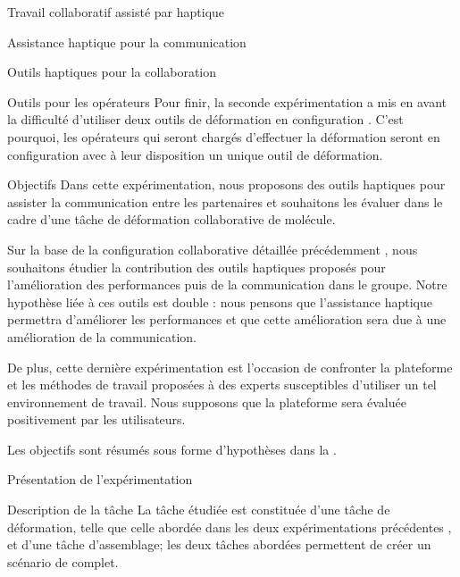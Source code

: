 \documentclass[myfrancais,ngerman,english,french]{mythesis}
\begin{document}
\begin{mychapter}{Travail collaboratif assisté par haptique}
\begin{mysection}{Assistance haptique pour la communication}
\begin{mysubsection}{Outils haptiques pour la collaboration}
\begin{mysubsubsection}{Outils pour les opérateurs}
					Pour finir, la seconde expérimentation a mis en avant la difficulté d'utiliser deux outils de déformation en configuration .
					C'est pourquoi, les opérateurs qui seront chargés d'effectuer la déformation seront en configuration  avec à leur disposition un unique outil de déformation.
				\end{mysubsubsection}
			\end{mysubsection}
			\begin{mysubsection}{Objectifs}
				Dans cette expérimentation, nous proposons des outils haptiques pour assister la communication entre les partenaires et souhaitons les évaluer dans le cadre d'une tâche de déformation collaborative de molécule.

				Sur la base de la configuration collaborative détaillée précédemment , nous souhaitons étudier la contribution des outils haptiques proposés pour l'amélioration des performances puis de la communication dans le groupe.
				Notre hypothèse liée à ces outils est double : nous pensons que l'assistance haptique permettra d'améliorer les performances et que cette amélioration sera due à une amélioration de la communication.

				De plus, cette dernière expérimentation est l'occasion de confronter la plateforme et les méthodes de travail proposées à des experts susceptibles d'utiliser un tel environnement de travail.
				Nous supposons que la plateforme sera évaluée positivement par les utilisateurs.

				Les objectifs sont résumés sous forme d'hypothèses dans la .
			\end{mysubsection}
		\end{mysection}
		\begin{mysection}{Présentation de l'expérimentation}
			\begin{mysubsection}{Description de la tâche}
				La tâche étudiée est constituée d'une tâche de déformation, telle que celle abordée dans les deux expérimentations précédentes , et d'une tâche d'assemblage; les deux tâches abordées permettent de créer un scénario de  complet.


\end{mysubsection}
\end{mysection}
\end{mychapter}
\end{document}
